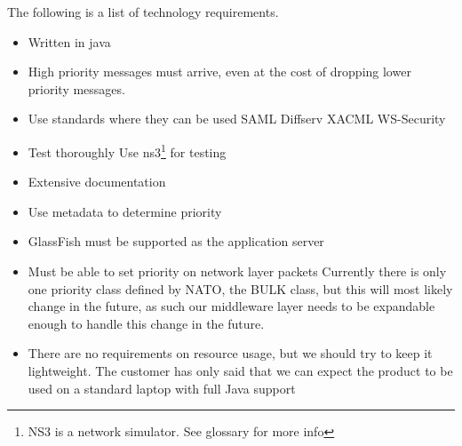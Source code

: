     The following is a list of technology requirements. 
    
    \begin{itemize}
        \item Written in java
        \item High priority messages must arrive, even at the cost of dropping lower priority messages.
        \item Use standards where they can be used
            \subitem SAML
            \subitem Diffserv
            \subitem XACML
            \subitem WS-Security
        \item Test thoroughly
            \subitem Use \gls{ns3}\footnote{NS3 is a network simulator. See glossary for more info} for testing
        \item Extensive documentation
        \item Use metadata to determine priority
        \item GlassFish must be supported as the application server
        \item Must be able to set priority on network layer packets
            \subitem Currently there is only one priority class defined by NATO, the BULK class, but this will most likely change in the future, as such our middleware layer needs to be expandable enough to handle this change in the future.
        \item There are no requirements on resource usage, but we should try to keep it lightweight.
            \subitem The customer has only said that we can expect the product to be used on a standard laptop with full Java support
    \end{itemize}

